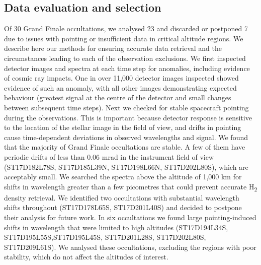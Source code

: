 \subsection{Data evaluation and selection}
Of 30 Grand Finale occultations, we analysed 23 and discarded or postponed 7 due to issues with pointing or insufficient data in critical altitude regions. We describe here our methods for ensuring accurate data retrieval and the circumstances leading to each of the observation exclusions. We first inspected detector images and spectra at each time step for anomalies, including evidence of cosmic ray impacts. One in over 11,000 detector images inspected showed evidence of such an anomaly, with all other images demonstrating expected behaviour (greatest signal at the centre of the detector and small changes between subsequent time steps). Next we checked for stable spacecraft pointing during the observations. This is important because detector response is sensitive to the location of the stellar image in the field of view, and drifts in pointing cause time-dependent deviations in observed wavelengths and signal. We found that the majority of Grand Finale occultations are stable. A few of them have periodic drifts of less than 0.06 mrad in the instrument field of view (ST17D182L78S, ST17D185L39N, ST17D198L66N, ST17D202L80S), which are acceptably small. We searched the spectra above the altitude of 1,000 km for shifts in wavelength greater than a few picometres that could prevent accurate H\textsubscript{2} density retrieval. We identified two occultations with substantial wavelength shifts throughout (ST17D178L65S, ST17D201L40S) and decided to postpone their analysis for future work. In six occultations we found large pointing-induced shifts in wavelength that were limited to high altitudes (ST17D194L34S, ST17D195L55S,ST17D195L45S, ST17D201L28S, ST17D202L80S, ST17D209L61S). We analysed these occultations, excluding the regions with poor stability, which do not affect the altitudes of interest.

